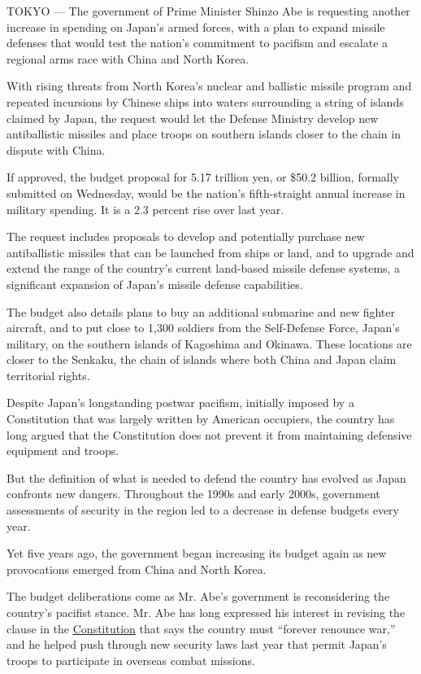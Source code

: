 TOKYO --- The government of Prime Minister Shinzo Abe is requesting
another increase in spending on Japan's armed forces, with a plan to
expand missile defenses that would test the nation's commitment to
pacifism and escalate a regional arms race with China and North Korea.

With rising threats from North Korea's nuclear and ballistic missile
program and repeated incursions by Chinese ships into waters surrounding
a string of islands claimed by Japan, the request would let the Defense
Ministry develop new antiballistic missiles and place troops on southern
islands closer to the chain in dispute with China.

If approved, the budget proposal for 5.17 trillion yen, or \$50.2
billion, formally submitted on Wednesday, would be the nation's
fifth-straight annual increase in military spending. It is a 2.3 percent
rise over last year.

The request includes proposals to develop and potentially purchase new
antiballistic missiles that can be launched from ships or land, and to
upgrade and extend the range of the country's current land-based missile
defense systems, a significant expansion of Japan's missile defense
capabilities.

The budget also details plans to buy an additional submarine and new
fighter aircraft, and to put close to 1,300 soldiers from the
Self-Defense Force, Japan's military, on the southern islands of
Kagoshima and Okinawa. These locations are closer to the Senkaku, the
chain of islands where both China and Japan claim territorial rights.

Despite Japan's longstanding postwar pacifism, initially imposed by a
Constitution that was largely written by American occupiers, the country
has long argued that the Constitution does not prevent it from
maintaining defensive equipment and troops.

But the definition of what is needed to defend the country has evolved
as Japan confronts new dangers. Throughout the 1990s and early 2000s,
government assessments of security in the region led to a decrease in
defense budgets every year.

Yet five years ago, the government began increasing its budget again as
new provocations emerged from China and North Korea.

The budget deliberations come as Mr. Abe's government is reconsidering
the country's pacifist stance. Mr. Abe has long expressed his interest
in revising the clause in the
\href{http://japan.kantei.go.jp/constitution_and_government_of_japan/constitution_e.html}{Constitution}
that says the country must ``forever renounce war,'' and he helped push
through new security laws last year that permit Japan's troops to
participate in overseas combat missions.

